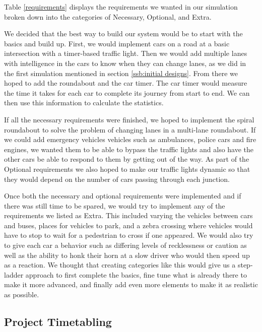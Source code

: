 \documentclass{article}
\begin{document}
    
    
Table \ref{requirements} displays the requirements we wanted in our simulation broken down into the categories of Necessary, Optional, and Extra. 

We decided that the best way to build our system would be to start with the basics and build up. First, we would implement cars on a road at a basic intersection with a timer-based traffic light. Then we would add multiple lanes with intelligence in the cars to know when they can change lanes, as we did in the first simulation mentioned in section \ref{ssb:initial designs}. From there we hoped to add the roundabout and the car timer. The car timer would measure the time it takes for each car to complete its journey from start to end. We can then use this information to calculate the statistics. 

If all the necessary requirements were finished, we hoped to implement the spiral roundabout to solve the problem of changing lanes in a multi-lane roundabout. If we could add emergency vehicles vehicles such as ambulances, police cars and fire engines, we wanted them to be able to bypass the traffic lights and also have the other cars be able to respond to them by getting out of the way. As part of the Optional requirements we also hoped to make our traffic lights dynamic so that they would depend on the number of cars passing through each junction.


 Once both the necessary and optional requirements were implemented and if there was still time to be spared, we would try to implement any of the requirements we listed as Extra. This included varying the vehicles between cars and buses, places for vehicles to park, and a zebra crossing where vehicles would have to stop to wait for a pedestrian to cross if one appeared. We would also try to give each car a behavior such as differing levels of recklessness or caution as well as the ability to honk their horn at a slow driver who would then speed up as a reaction.
\newline\indent	We thought that creating categories like this would give us a step-ladder approach to first complete the basics, fine tune what is already there to make it more advanced, and finally add even more elements to make it as realistic as possible.


\subsection{Project Timetabling}
\end{document}
